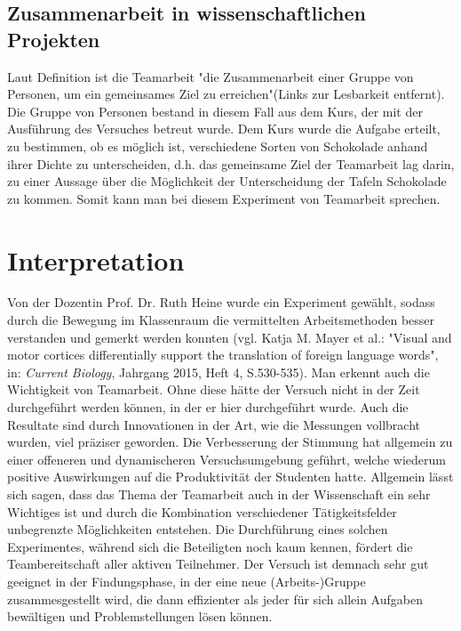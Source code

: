 \documentclass[12pt]{scrartcl}
\begin{document}
\subsection{Zusammenarbeit in wissenschaftlichen Projekten}
Laut Definition ist die Teamarbeit "die Zusammenarbeit einer Gruppe von Personen, um ein gemeinsames Ziel zu erreichen"(Links zur Lesbarkeit entfernt). Die Gruppe von Personen bestand in diesem Fall aus dem Kurs, der mit der Ausführung des Versuches betreut wurde. Dem Kurs wurde die Aufgabe erteilt, zu bestimmen, ob es möglich ist, verschiedene Sorten von Schokolade anhand ihrer Dichte zu unterscheiden, d.h. das gemeinsame Ziel der Teamarbeit lag darin, zu einer Aussage über die Möglichkeit der Unterscheidung der Tafeln Schokolade zu kommen. Somit kann man bei diesem Experiment von Teamarbeit sprechen.
\section{Interpretation}
Von der Dozentin Prof. Dr. Ruth Heine wurde ein Experiment gewählt, sodass durch die Bewegung im Klassenraum die vermittelten Arbeitsmethoden besser verstanden und gemerkt werden konnten (vgl. Katja M. Mayer et al.: "Visual and motor cortices differentially support the translation of foreign language words", in: \textit{Current Biology}, Jahrgang 2015, Heft 4, S.530-535). Man erkennt auch die Wichtigkeit von Teamarbeit. Ohne diese hätte der Versuch nicht in der Zeit durchgeführt werden können, in der er hier durchgeführt wurde. Auch die Resultate sind durch Innovationen in der Art, wie die Messungen vollbracht wurden, viel präziser geworden. Die Verbesserung der Stimmung hat allgemein zu einer offeneren und dynamischeren Versuchsumgebung geführt, welche wiederum positive Auswirkungen auf die Produktivität der Studenten hatte. Allgemein lässt sich sagen, dass das Thema der Teamarbeit auch in der Wissenschaft ein sehr Wichtiges ist und durch die Kombination verschiedener Tätigkeitsfelder unbegrenzte Möglichkeiten entstehen. Die Durchführung eines solchen Experimentes, während sich die Beteiligten noch kaum kennen, fördert die Teambereitschaft aller aktiven Teilnehmer. Der Versuch ist demnach sehr gut geeignet in der Findungsphase, in der eine neue (Arbeits-)Gruppe zusammesgestellt wird, die dann effizienter als jeder für sich allein Aufgaben bewältigen und Problemstellungen lösen können.
\end{document}
